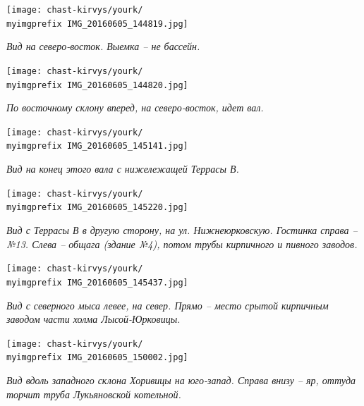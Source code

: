 \newpage

\begin{center}
\texttt{[image: chast-kirvys/yourk/\\myimgprefix IMG\_20160605\_144819.jpg]}

\textit{Вид на северо-восток. Выемка – не бассейн.}
\end{center}

\begin{center}
\texttt{[image: chast-kirvys/yourk/\\myimgprefix IMG\_20160605\_144820.jpg]}

\textit{По восточному склону вперед, на северо-восток, идет вал.}
\end{center}

\newpage

\begin{center}
\texttt{[image: chast-kirvys/yourk/\\myimgprefix IMG\_20160605\_145141.jpg]}

\textit{Вид на конец этого вала с нижележащей Террасы В.}
\end{center}


\begin{center}
\texttt{[image: chast-kirvys/yourk/\\myimgprefix IMG\_20160605\_145220.jpg]}

\textit{Вид с Террасы В в другую сторону, на ул. Нижнеюрковскую. Гостинка справа – №13. Слева – общага (здание №4), потом трубы кирпичного и пивного заводов.}
\end{center}

\newpage

\begin{center}
\texttt{[image: chast-kirvys/yourk/\\myimgprefix IMG\_20160605\_145437.jpg]}

\textit{Вид с северного мыса левее, на север. Прямо – место срытой кирпичным заводом части холма Лысой-Юрковицы.}
\end{center}


\begin{center}
\texttt{[image: chast-kirvys/yourk/\\myimgprefix IMG\_20160605\_150002.jpg]}

\textit{Вид вдоль западного склона Хоривицы на юго-запад. Справа внизу – яр, оттуда торчит труба Лукьяновской котельной.}
\end{center}

\newpage

